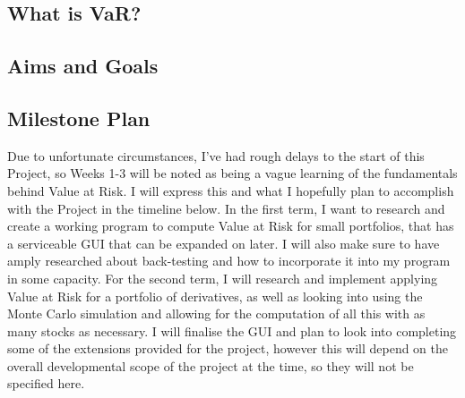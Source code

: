 \documentclass{article}
\begin{document}
\subsection{What is VaR?}

\subsection{Aims and Goals}

\subsection{Milestone Plan}
Due to unfortunate circumstances, I've had rough delays to the start of this Project, so Weeks 1-3 will be noted as being a vague learning of the fundamentals behind Value at Risk. I will express this and what I hopefully plan to accomplish with the Project in the timeline below. In the first term, I want to research and create a working program to compute Value at Risk for small portfolios, that has a serviceable GUI that can be expanded on later. I will also make sure to have amply researched about back-testing and how to incorporate it into my program in some capacity. For the second term, I will research and implement applying Value at Risk for a portfolio of derivatives, as well as looking into using the Monte Carlo simulation and allowing for the computation of all this with as many stocks as necessary. I will finalise the GUI and plan to look into completing some of the extensions provided for the project, however this will depend on the overall developmental scope of the project at the time, so they will not be specified here.
\end{document}
